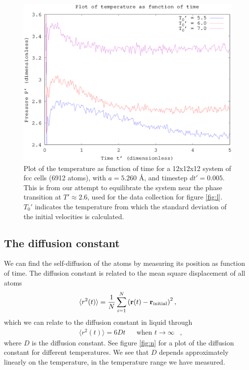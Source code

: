 \begin{figure}[h!]
    \centering
    \includegraphics[width =.70\textwidth]{bilder/l_plot02.eps}
    \parbox{4in} {
        \caption{
            \small{
                Plot of the temperature as function of time for a 12x12x12 system of fcc cells (6912 atoms), with $a = 5.260$ \AA, and timestep $dt' = 0.005$. This is from our attempt to equilibrate the system near the phase transition at $T'\approx2.6$, used for the data collection for figure \ref{fig:l}. $T_0'$ indicates the temperature from which the standard deviation of the initial velocities is calculated.
            }
            \label{fig:l_eq}
        }
    }
\end{figure}

\subsection*{The diffusion constant}
We can find the self-diffusion of the atoms by measuring its position as function of time. The diffusion constant is related to the mean square displacement of all atoms
\[
    \langle r^2(t) \rangle = \frac{1}{N} \sum_{i=1}^N \left( \mathbf{r}(t) - \mathbf{r}_{\text{initial}} \right)^2,
\]
which we can relate to the diffusion constant in liquid through
\begin{align*}
    &\langle r^2(t) \rangle = 6Dt& &\text{when } t \rightarrow \infty&,
\end{align*}
where $D$ is the diffusion constant. See figure \ref{fig:n} for a plot of the diffusion constant for different temperatures. We see that $D$ depends approximately linearly on the temperature, in the temperature range we have measured.

